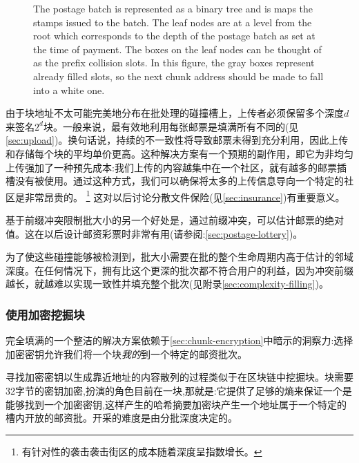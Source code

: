 \begin{figure}[htbp]
  \centering
    \caption[Limiting the size of a postage stamp \statusgreen]{The postage batch is represented as a binary tree and is maps the stamps issued to the batch.  The leaf nodes are at a level from the root which corresponds to the depth of the postage batch as set at the time of payment. The boxes on the leaf nodes can be thought of as the prefix collision slots. In this figure, the gray boxes represent already filled slots, so the next chunk address should be made to fall into a white one.}
  \label{fig:prefix-collision}
\end{figure}


由于块地址不太可能完美地分布在批处理的碰撞槽上，上传者必须保留多个深度$d$来签名$2^d$块。一般来说，最有效地利用每张邮票是填满所有不同的(见\ref{sec:upload})。换句话说，持续的不一致性将导致邮票未得到充分利用，因此上传和存储每个块的平均单价更高。这种解决方案有一个预期的副作用，即它为非均匀上传强加了一种预先成本:我们上传的内容越集中在一个社区，就有越多的邮票插槽没有被使用。通过这种方式，我们可以确保将太多的上传信息导向一个特定的社区是非常昂贵的。%
%
\footnote{有针对性的袭击袭击街区的成本随着深度呈指数增长。}
%
这对以后讨论分散文件保险(见\ref{sec:insurance})有重要意义。 

基于前缀冲突限制批大小的另一个好处是，通过前缀冲突，可以估计邮票的绝对值。这在以后设计邮资彩票时非常有用(请参阅:\ref{sec:postage-lottery})。 


为了使这些碰撞能够被检测到，批大小需要在批的整个生命周期内高于估计的邻域深度。在任何情况下，拥有比这个更深的批次都不符合用户的利益，因为冲突前缀越长，就越难以实现一致性并填充整个批次(见附录\ref{sec:complexity-filling})。 


\subsubsection{使用加密挖掘块}

完全填满的一个整洁的解决方案依赖于\ref{sec:chunk-encryption}中暗示的洞察力:选择加密密钥允许我们将一个块\emph{我的}到一个特定的邮资批次。

寻找加密密钥以生成靠近地址的内容散列的过程类似于在区块链中挖掘块。块需要32字节的密钥加密,扮演的角色目前在一块,那就是:它提供了足够的熵来保证一个是能够找到一个加密密钥,这样产生的哈希摘要加密块产生一个地址属于一个特定的槽内开放的邮资批。开采的难度是由分批深度决定的。 

